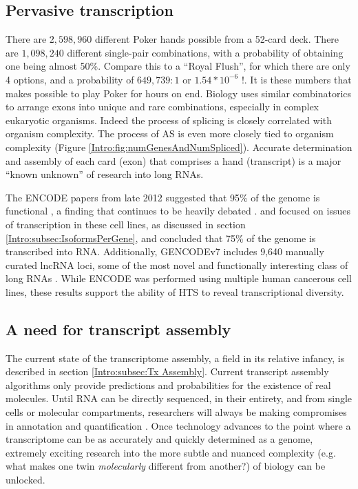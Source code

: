   \subsection{Pervasive transcription}
    \label{Disc:subsec:Pervasive Tx}

    There are $2,598,960$ different Poker hands possible from a 52-card deck. There are $1,098,240$ different single-pair combinations, with a probability of obtaining one being almost 50\%. Compare this to a ``Royal Flush'', for which there are only 4 options, and a probability of $649,739:1$ or $1.54 * 10^{-6}$ !. It is these numbers that makes possible to play Poker for hours on end. Biology uses similar combinatorics to arrange exons into unique and rare combinations, especially in complex eukaryotic organisms. Indeed the process of splicing is closely correlated with organism complexity. The process of AS is even more closely tied to organism complexity (Figure \ref{Intro:fig:numGenesAndNumSpliced}). Accurate determination and assembly of each card (exon) that comprises a hand (transcript) is a major ``known unknown'' \citep{Rumsfeld2011} of research into long RNAs.

    The ENCODE papers from late 2012 suggested that 95\% of the genome is functional \citep{Dunham2012}, a finding that continues to be heavily debated \citep{Graur2013,Bhattacharjee2014}. \citet{Djebali2012} and focused on issues of transcription in these cell lines, as discussed in section \ref{Intro:subsec:IsoformsPerGene}, and concluded that 75\% of the genome is transcribed into RNA. Additionally, GENCODEv7 includes 9,640 manually curated lncRNA loci, some of the most novel and functionally interesting class of long RNAs \citep{Derrien2012,Pauli2011}. While ENCODE was performed using multiple human cancerous cell lines, these results support the ability of HTS to reveal transcriptional diversity.

  \subsection{A need for transcript assembly}
    \label{Disc:subsec:need for Tx assembly}

    The current state of the transcriptome assembly, a field in its relative infancy, is described in section \ref{Intro:subsec:Tx Assembly}. Current transcript assembly algorithms only provide predictions and probabilities for the existence of real molecules. Until RNA can be directly sequenced, in their entirety, and from single cells or molecular compartments, researchers will always be making compromises in annotation and quantification \citep{Ozsolak2010}. Once technology advances to the point where a transcriptome can be as accurately and quickly determined as a genome, extremely exciting research into the more subtle and nuanced complexity (e.g. what makes one twin \textit{molecularly} different from another?) of biology can be unlocked.

